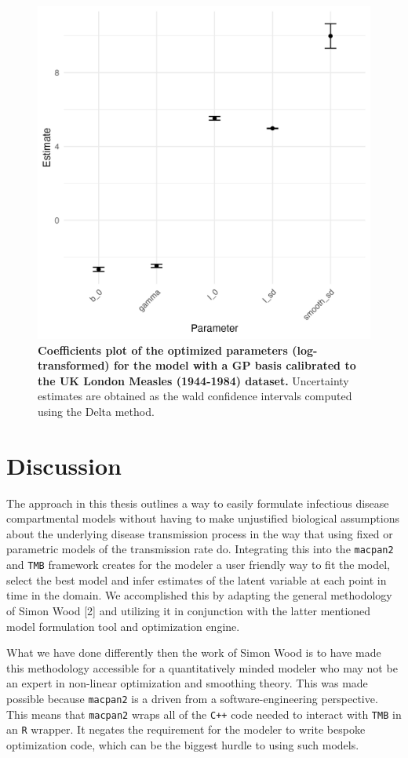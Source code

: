 \documentclass[
11pt, %
oneside, %
english, %
singlespacing, %
]{macthesis} %
\begin{document}
\begin{figure}
\centering
\includegraphics[width=\textwidth, height = 0.5\textwidth]{figure/MeaslesCoefficentsPlot.png}
\caption[Coefficients Plot Measles (1944-1984)]{\textbf{Coefficients plot of the optimized parameters (log-transformed) for the model with a GP basis calibrated to the UK London Measles (1944-1984) dataset.} Uncertainty estimates are obtained as the wald confidence intervals computed using the Delta method.}
\label{fig:Measles_coefs}
\end{figure}

\chapter{Discussion}\label{Discussion}

The approach in this thesis outlines a way to easily formulate infectious disease compartmental models without having to make unjustified biological assumptions about the underlying disease transmission process in the way that using fixed or parametric models of the transmission rate do. Integrating this into the \texttt{macpan2} and \texttt{TMB} framework creates for the modeler a user friendly way to fit the model, select the best model and infer estimates of the latent variable at each point in time in the domain. We accomplished this by adapting the general methodology of Simon Wood {[}2{]} and utilizing it in conjunction with the latter mentioned model formulation tool and optimization engine.

What we have done differently then the work of Simon Wood is to have made this methodology accessible for a quantitatively minded modeler who may not be an expert in non-linear optimization and smoothing theory. This was made possible because \texttt{macpan2} is a driven from a software-engineering perspective. This means that \texttt{macpan2} wraps all of the \texttt{C++} code needed to interact with \texttt{TMB} in an \texttt{R} wrapper. It negates the requirement for the modeler to write bespoke optimization code, which can be the biggest hurdle to using such models.
\end{document}
